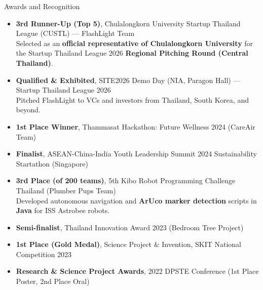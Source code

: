\documentclass[11pt]{resume} %
\begin{document}
\begin{rSection}{Awards and Recognition}
    \begin{itemize}
        \item \textbf{3rd Runner-Up (Top 5)}, Chulalongkorn University Startup Thailand League (CUSTL) --- FlashLight Team \\[-0.4ex]
        Selected as an \textbf{official representative of Chulalongkorn University} for the Startup Thailand League 2026 \textbf{Regional Pitching Round (Central Thailand)}.
        \item \textbf{Qualified \& Exhibited}, SITE2026 Demo Day (NIA, Paragon Hall) --- Startup Thailand League 2026 \\[-0.4ex]
        Pitched FlashLight to VCs and investors from Thailand, South Korea, and beyond.
        \item \textbf{1st Place Winner}, Thammasat Hackathon: Future Wellness 2024 (CareAir Team)
        \item \textbf{Finalist}, ASEAN-China-India Youth Leadership Summit 2024 Sustainability Startathon (Singapore)
        \item \textbf{3rd Place (of 200 teams)}, 5th Kibo Robot Programming Challenge Thailand (Plumber Pups Team) \\[-0.4ex]
        Developed autonomous navigation and \textbf{ArUco marker detection} scripts in \textbf{Java} for ISS Astrobee robots.
        \item \textbf{Semi-finalist}, Thailand Innovation Award 2023 (Bedroom Tree Project)
        \item \textbf{1st Place (Gold Medal)}, Science Project \& Invention, SKIT National Competition 2023
        \item \textbf{Research \& Science Project Awards}, 2022 DPSTE Conference (1st Place Poster, 2nd Place Oral)
    \end{itemize}
\end{rSection}

\end{document}
